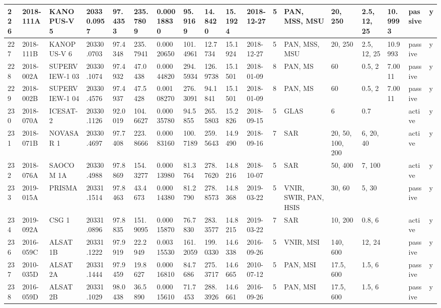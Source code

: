 \documentclass[12pt,a4paper,notitlepage,twoside,openright]{report}
\begin{document}
\begin{longtable}{|l|l|l|l|l|l|l|l|l|l|l|l|l|l|l|l|l|l|}
        226 & 2018-111A & KANOPUS-V 5 & 20330.0957 & 97.4353 & 235.7809 & 0.00018830 & 95.9169 & 14.8420 & 15.1924 & 2018-12-27 & 5 & PAN, MSS, MSU & 20, 250 & 2.5, 12, 25 & 10.9993 & passive & y \\ \hline
        227 & 2018-111B & KANOPUS-V 6 & 20330.0703 & 97.4348 & 235.7941 & 0.00020650 & 101.4961 & 12.7734 & 15.1924 & 2018-12-27 & 5 & PAN, MSS, MSU & 20, 250 & 2.5, 12, 25 & 10.9993 & passive & y \\ \hline
        228 & 2018-002A & SUPERVIEW-1 03 & 20330.1074 & 97.4932 & 47.0438 & 0.00044820 & 294.5934 & 126.9738 & 15.1501 & 2018-01-09 & 8 & PAN, MS & 60 & 0.5, 2 & 7.0011 & passive & y \\ \hline
        229 & 2018-002B & SUPERVIEW-1 04 & 20330.4576 & 97.4937 & 47.5428 & 0.00108270 & 276.3091 & 94.1841 & 15.1501 & 2018-01-09 & 8 & PAN, MS & 60 & 0.5, 2 & 7.0011 & passive & y \\ \hline
        230 & 2018-070A & ICESAT-2 & 20330.1126 & 92.0019 & 104.6627 & 0.00035780 & 94.5855 & 265.5803 & 15.2826 & 2018-09-15 & 5 & GLAS & 6 & 0.7 &  & active & y \\ \hline
        231 & 2018-071B & NOVASAR 1 & 20330.4697 & 97.7408 & 223.8666 & 0.00083160 & 100.7189 & 259.5643 & 14.9490 & 2018-09-16 & 7 & SAR & 20, 50, 100, 200 & 6, 20, 40 &  & active & y \\ \hline
        232 & 2018-076A & SAOCOM 1A & 20330.4988 & 97.8869 & 154.3277 & 0.00013980 & 81.3764 & 278.7620 & 14.8216 & 2018-10-07 & 5 & SAR & 50, 400 & 7, 100 &  & active & y \\ \hline
        233 & 2019-015A & PRISMA & 20331.1514 & 97.8463 & 43.4673 & 0.00014380 & 81.2790 & 278.8573 & 14.8368 & 2019-03-22 & 5 & VNIR, SWIR, PAN, HSIS & 30, 60 & 5, 30 &  & passive & y \\ \hline
        234 & 2019-092A & CSG 1 & 20331.0896 & 97.8835 & 151.9095 & 0.00015870 & 76.7830 & 283.3577 & 14.8215 & 2019-03-22 & 7 & SAR & 10, 200 & 0.8, 6 &  & active & y \\ \hline
        236 & 2016-059C & ALSAT 1B & 20331.1222 & 97.9919 & 22.2949 & 0.00315530 & 161.2059 & 199.0330 & 14.6338 & 2016-09-26 & 5 & VNIR, MSI & 140, 600 & 12, 24 &  & passive & y \\ \hline
        237 & 2010-035D & ALSAT 2A & 20331.1444 & 97.9459 & 19.8627 & 0.00016810 & 84.7686 & 275.3717 & 14.6665 & 2010-07-12 & 5 & PAN, MSI & 17.5, 600 & 1.5, 6 &  & passive & y \\ \hline
        238 & 2016-059D & ALSAT 2B & 20331.1029 & 98.0438 & 36.5890 & 0.00015610 & 71.7453 & 288.3926 & 14.6661 & 2016-09-26 & 5 & PAN, MSI & 17.5, 600 & 1.5, 6 &  & passive & y \\ \hline

\end{longtable}
\end{document}
